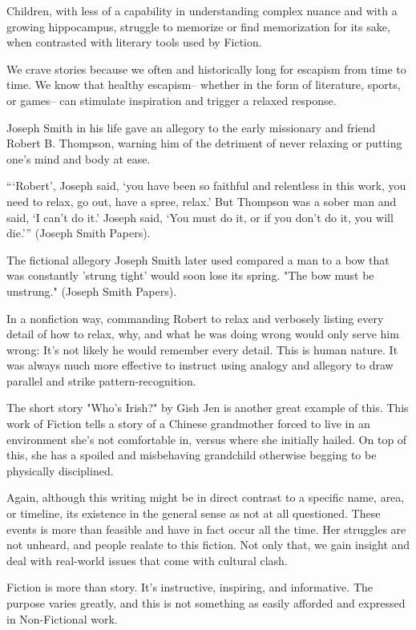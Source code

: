 \documentclass[12pt]{article}
\begin{document}
\begin{flushleft}
Children, with less of a capability in understanding complex nuance and with a growing hippocampus, struggle to memorize or find memorization for its sake, when contrasted with literary tools used by Fiction.

We crave stories because we often and historically long for escapism from time to time. We know that healthy escapism-- whether in the form of literature, sports, or games-- can stimulate inspiration and trigger a relaxed response.


Joseph Smith in his life gave an allegory to the early missionary and friend Robert B. Thompson, warning him of the detriment of never relaxing or putting one's mind and body at ease.

“‘Robert’, Joseph said, ‘you have been so faithful and relentless in this work, you need to relax, go out, have a spree, relax.’ But Thompson was a sober man and said, ‘I can’t do it.’ Joseph said, ‘You must do it, or if you don’t do it, you will die.'” (Joseph Smith Papers).

The fictional allegory Joseph Smith later used compared a man to a bow that was constantly 'strung tight' would soon lose its spring.
"The bow must be unstrung." (Joseph Smith Papers).

In a nonfiction way, commanding Robert to relax and verbosely listing every detail of how to relax, why, and what he was doing wrong would only serve him wrong: It's not likely he would remember every detail. This is human nature. It was always much more effective to instruct using analogy and allegory to draw parallel and strike pattern-recognition.

The short story "Who's Irish?" by Gish Jen is another great example of this.
This work of Fiction tells a story of a Chinese grandmother forced to live in an environment she's not comfortable in, versus where she initially hailed.
On top of this, she has a spoiled and misbehaving grandchild otherwise begging to be physically disciplined.

Again, although this writing might be in direct contrast to a specific name, area, or timeline, its existence in the general sense as not at all questioned. These events is more than feasible and have in fact occur all the time.
Her struggles are not unheard, and people realate to this fiction. Not only that, we gain insight and deal with real-world issues that come with cultural clash.



Fiction is more than story. It's instructive, inspiring, and informative. The purpose varies greatly, and this is not something as easily afforded and expressed in Non-Fictional work.






\end{flushleft}
\end{document}
